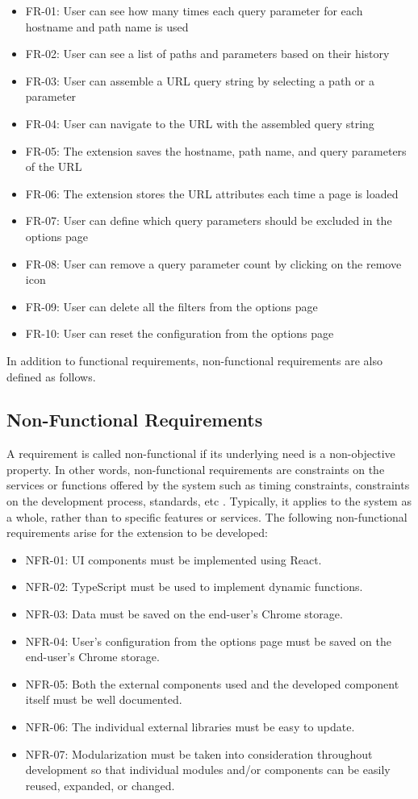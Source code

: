 \begin{itemize}
  \item FR-01: User can see how many times each query parameter for each hostname and path name is used
  \item FR-02: User can see a list of paths and parameters based on their history
  \item FR-03: User can assemble a URL query string by selecting a path or a parameter
  \item FR-04: User can navigate to the URL with the assembled query string
  \item FR-05: The extension saves the hostname, path name, and query parameters of the URL
  \item FR-06: The extension stores the URL attributes each time a page is loaded
  \item FR-07: User can define which query parameters should be excluded in the options page
  \item FR-08: User can remove a query parameter count by clicking on the remove icon
  \item FR-09: User can delete all the filters from the options page
  \item FR-10: User can reset the configuration from the options page
\end{itemize}

In addition to functional requirements, non-functional requirements are also defined as follows.

\subsection{Non-Functional Requirements}
A requirement is called non-functional if its underlying need is a non-objective property. In other words, non-functional requirements are constraints on the services or functions offered by the system such as timing constraints, constraints on the development process, standards, etc \autocite{sommerville2011software}. Typically, it applies to the system as a whole, rather than to specific features or services. The following non-functional requirements arise for the extension to be developed:

\begin{itemize}
  \item NFR-01: UI components must be implemented using React.
  \item NFR-02: TypeScript must be used to implement dynamic functions.
  \item NFR-03: Data must be saved on the end-user's Chrome storage.
  \item NFR-04: User's configuration from the options page must be saved on the end-user's Chrome storage.
  \item NFR-05: Both the external components used and the developed component itself must be well documented.
  \item NFR-06: The individual external libraries must be easy to update.
  \item NFR-07: Modularization must be taken into consideration throughout development so that individual modules and/or components can be easily reused, expanded, or changed.
\end{itemize}

